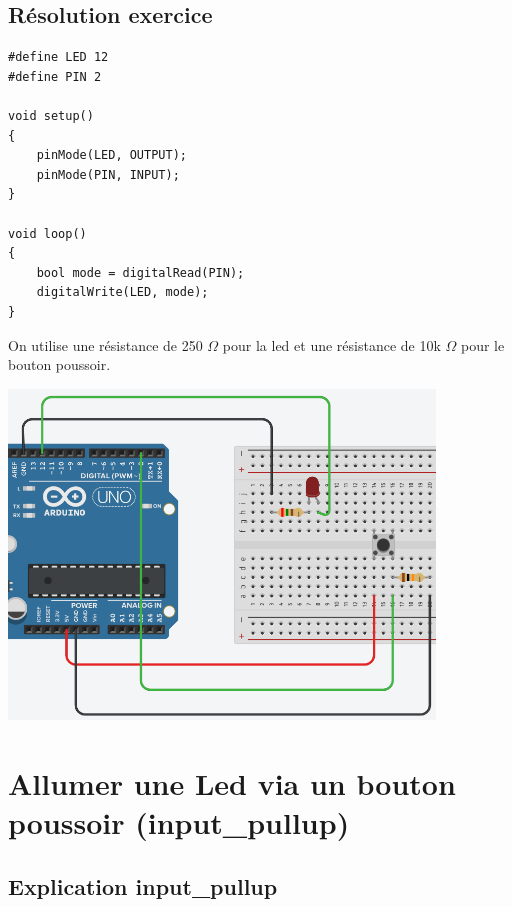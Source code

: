 \documentclass[a4paper]{article}
\begin{document}
\subsection{Résolution exercice}





\begin{lstlisting}[frame=single]
#define LED 12
#define PIN 2

void setup()
{
    pinMode(LED, OUTPUT);
    pinMode(PIN, INPUT);
}

void loop()
{
    bool mode = digitalRead(PIN);
    digitalWrite(LED, mode);
}
\end{lstlisting}

On utilise une résistance de 250 $ \Omega $ pour la led et une résistance de 10k $ \Omega $ pour le bouton poussoir.
\begin{center}
    \includegraphics[width=0.85\textwidth]{images/labo1-manip1.PNG}
\end{center}










\section{Allumer une Led via un bouton poussoir (input\_pullup)}










\subsection{Explication input\_pullup}
\end{document}
